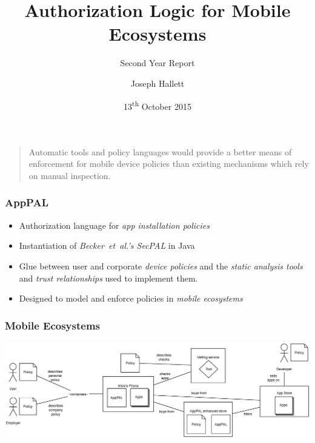 \documentclass{beamer}
\title{Authorization Logic for Mobile Ecosystems}
\subtitle{Second Year Report}
\author{Joseph Hallett}
\date{13\textsuperscript{th} October 2015}
\begin{document}
\maketitle

\begin{frame}
  \begin{quote}
    Automatic tools and policy languages would
    provide a better means of enforcement for 
    mobile device policies than existing
    mechanisms which rely on manual inspection. 
  \end{quote}
\end{frame}


\begin{frame}
  \frametitle{AppPAL}
  \begin{itemize}
  \item Authorization language for \emph{app installation policies}
  \item Instantiation of \emph{Becker~et~al.'s SecPAL} in Java
  \item Glue between user and corporate \emph{device policies} and the
    \emph{static analysis tools} and \emph{trust relationships} used to
    implement them.
  \item Designed to model and enforce policies in \emph{mobile ecosystems}
  \end{itemize}
\end{frame}

\begin{frame}
  \frametitle{Mobile Ecosystems}
  \includegraphics[width=\linewidth]{images/ecosystem.eps}
\end{frame}
\end{document}
